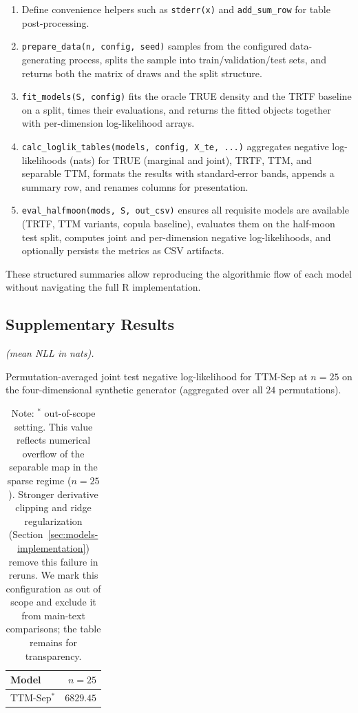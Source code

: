 \documentclass[11pt,a4paper,twoside]{book}\usepackage[]{graphicx}\usepackage[]{xcolor}
\begin{document}
\begin{enumerate}
  \item Define convenience helpers such as \texttt{stderr(x)} and \texttt{add\_sum\_row} for table post-processing.
  \item \texttt{prepare\_data(n, config, seed)} samples from the configured data-generating process, splits the sample into train/validation/test sets, and returns both the matrix of draws and the split structure.
  \item \texttt{fit\_models(S, config)} fits the oracle TRUE density and the TRTF baseline on a split, times their evaluations, and returns the fitted objects together with per-dimension log-likelihood arrays.
  \item \texttt{calc\_loglik\_tables(models, config, X\_te, ...)} aggregates negative log-likelihoods (nats) for TRUE (marginal and joint), TRTF, TTM, and separable TTM, formats the results with standard-error bands, appends a summary row, and renames columns for presentation.
  \item \texttt{eval\_halfmoon(mods, S, out\_csv)} ensures all requisite models are available (TRTF, TTM variants, copula baseline), evaluates them on the half-moon test split, computes joint and per-dimension negative log-likelihoods, and optionally persists the metrics as CSV artifacts.
\end{enumerate}

These structured summaries allow reproducing the algorithmic flow of each model without navigating the full R implementation.

\subsection{Supplementary Results}\label{app:supplementary}

\begin{table}[htbp]
  \centering
  \textit{(mean NLL in nats).}
  \caption{Permutation-averaged joint test negative log-likelihood for TTM-Sep at $n=25$ on the four-dimensional synthetic generator (aggregated over all $24$ permutations).}
  \label{tab:ttmsep-n25-overflow}
  \begin{tabular}{lr}
    \hline
    Model & $n=25$ \\
    \hline
    TTM-Sep$^{\ast}$ & $6829.45$ \\
    \hline
  \end{tabular}
  \caption*{Note: $^{\ast}$ out-of-scope setting. This value reflects numerical overflow of the separable map in the sparse regime ($n=25$). Stronger derivative clipping and ridge regularization (Section~\ref{sec:models-implementation}) remove this failure in reruns. We mark this configuration as out of scope and exclude it from main-text comparisons; the table remains for transparency.}
\end{table}
\end{document}

